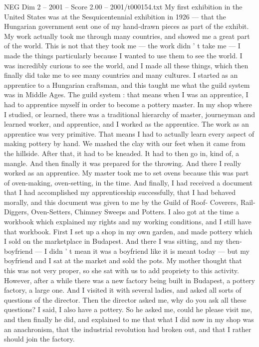 \begin{textsample}{NEG Dim 2 – 2001 – Score 2.00 – 2001/t000154.txt}
My first exhibition in the United States was at the Sesquicentennial exhibition in 1926 — that the Hungarian government sent one of my hand-drawn pieces as part of the exhibit.
My work actually took me through many countries, and showed me a great part of the world.
This is not that they took me — the work didn ' t take me — I made the things particularly because I wanted to use them to see the world.
I was incredibly curious to see the world, and I made all these things, which then finally did take me to see many countries and many cultures.
I started as an apprentice to a Hungarian craftsman, and this taught me what the guild system was in Middle Ages.
The guild system : that means when I was an apprentice, I had to apprentice myself in order to become a pottery master.
In my shop where I studied, or learned, there was a traditional hierarchy of master, journeyman and learned worker, and apprentice, and I worked as the apprentice.
The work as an apprentice was very primitive.
That means I had to actually learn every aspect of making pottery by hand.
We mashed the clay with our feet when it came from the hillside.
After that, it had to be kneaded.
It had to then go in, kind of, a mangle.
And then finally it was prepared for the throwing.
And there I really worked as an apprentice.
My master took me to set ovens because this was part of oven-making, oven-setting, in the time.
And finally, I had received a document that I had accomplished my apprenticeship successfully, that I had behaved morally, and this document was given to me by the Guild of Roof- Coverers, Rail-Diggers, Oven-Setters, Chimney Sweeps and Potters.
I also got at the time a workbook which explained my rights and my working conditions, and I still have that workbook.
First I set up a shop in my own garden, and made pottery which I sold on the marketplace in Budapest.
And there I was sitting, and my then-boyfriend — I didn ' t mean it was a boyfriend like it is meant today — but my boyfriend and I sat at the market and sold the pots.
My mother thought that this was not very proper, so she sat with us to add propriety to this activity.
However, after a while there was a new factory being built in Budapest, a pottery factory, a large one.
And I visited it with several ladies, and asked all sorts of questions of the director.
Then the director asked me, why do you ask all these questions?
I said, I also have a pottery.
So he asked me, could he please visit me, and then finally he did, and explained to me that what I did now in my shop was an anachronism, that the industrial revolution had broken out, and that I rather should join the factory.

\end{textsample}
